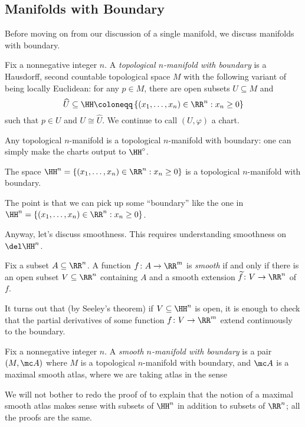 \documentclass[../notes.tex]{subfiles}
\begin{document}
\subsection{Manifolds with Boundary}
Before moving on from our discussion of a single manifold, we discuss manifolds with boundary.
\begin{definition}
	Fix a nonnegative integer $n$. A \textit{topological $n$-manifold with boundary} is a Hausdorff, second countable topological space $M$ with the following variant of being locally Euclidean: for any $p\in M$, there are open subsets $U\subseteq M$ and
	\[\widehat U\subseteq\HH\coloneqq\left\{(x_1,\ldots,x_n)\in\RR^n:x_n\ge0\right\}\]
	such that $p\in U$ and $U\cong\widehat U$. We continue to call $(U,\varphi)$ a chart.
\end{definition}
\begin{example}
	Any topological $n$-manifold is a topological $n$-manifold with boundary: one can simply make the charts output to $\HH^\circ$.
\end{example}
\begin{example}
	The space $\HH^n=\left\{(x_1,\ldots,x_n)\in\RR^n:x_n\ge0\right\}$ is a topological $n$-manifold with boundary.
\end{example}
The point is that we can pick up some ``boundary'' like the one in $\HH^n=\left\{(x_1,\ldots,x_n)\in\RR^n:x_n\ge0\right\}$.

Anyway, let's discuss smoothness. This requires understanding smoothness on $\del\HH^n$.
\begin{definition}
	Fix a subset $A\subseteq\RR^n$. A function $f\colon A\to\RR^m$ is \textit{smooth} if and only if there is an open subset $V\subseteq\RR^n$ containing $A$ and a smooth extension $\widetilde f\colon V\to\RR^n$ of $f$.
\end{definition}
\begin{remark}
	It turns out that (by Seeley's theorem) if $V\subseteq\HH^n$ is open, it is enough to check that the partial derivatives of some function $f\colon V\to\RR^m$ extend continuously to the boundary.
\end{remark}
\begin{definition}
	Fix a nonnegative integer $n$. A \textit{smooth $n$-manifold with boundary} is a pair $(M,\mc A)$ where $M$ is a topological $n$-manifold with boundary, and $\mc A$ is a maximal smooth atlas, where we are taking atlas in the sense
\end{definition}
We will not bother to redo the proof of  to explain that the notion of a maximal smooth atlas makes sense with subsets of $\HH^n$ in addition to subsets of $\RR^n$; all the proofs are the same.
\end{document}
